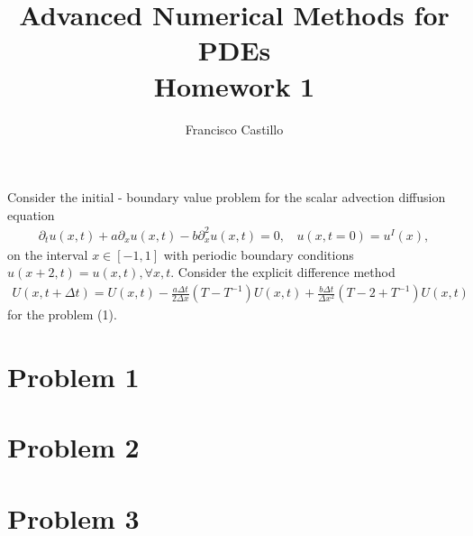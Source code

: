 \documentclass[12pt,answers]{exam}
\begin{document}
 
 
 
\title{\textbf{Advanced Numerical Methods for PDEs}\\ \Large{Homework 1}}%
\author{Francisco Castillo}
 

\maketitle
Consider the initial - boundary value problem for the scalar advection diffusion equation
\begin{align}\label{eq:PDE}
\partial_tu(x,t)+a\partial_xu(x,t)-b\partial_x^2u(x,t)=0,~~~~
u(x,t=0)=u^I(x),
\end{align}
on the interval $x\in[-1, 1]$ with periodic boundary conditions $u(x + 2, t) = u(x, t), \forall x, t$.
Consider the explicit difference method 
\begin{align}\label{eq:discrPDE}
U(x, t+\Delta t) = U(x, t)-\frac{a\Delta t}{ 2\Delta x}(T-T^{-1})U(x,t)+\frac{b\Delta t}{\Delta x^2}(T-2+T^{-1})U(x, t)
\end{align}
for the problem (1).
\section*{Problem 1}

\newpage
\section*{Problem 2}

\newpage
\section*{Problem 3}

\end{document}
